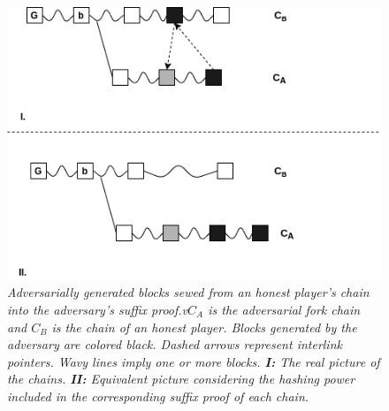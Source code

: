 \documentclass[11pt,a4paper]{article}
\begin{document}
\begin{figure}[h!]
	\begin{center}
		\includegraphics[scale=0.6]{figures/injection.png}
	\end{center}
	\caption{\textit{Adversarially generated blocks sewed from an honest player's chain into the adversary's suffix proof.v$C_A$ is the adversarial fork chain and $C_B$ is the chain of an honest player. Blocks generated by the adversary are colored black. Dashed arrows represent interlink pointers. Wavy lines imply one or more blocks. \textbf{I:} The real picture
	 of the chains. \textbf{II:} Equivalent picture considering the hashing power included in the corresponding suffix proof of each chain.}}
	\label{fig:injection}
\end{figure}
\end{document}
